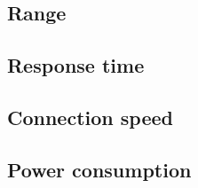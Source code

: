 \subsection{Range}

\subsection{Response time}

\subsection{Connection speed}

\subsection{Power consumption}
